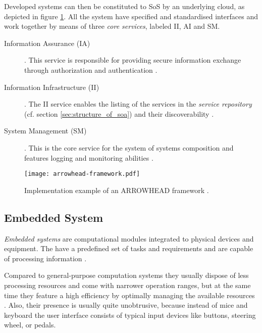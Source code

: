 Developed systems can then be constituted to SoS by an underlying cloud, as depicted in figure \ref{fig:arrowhead-framework}. All the system have specified and standardised interfaces and work together by means of three \emph{core services}, labeled II, AI and SM.
\begin{description}
\item [Information Assurance (IA)] .
This service is responsible for providing secure information exchange through authorization and authentication \cite{arrowhead:presentation}.
\item [Information Infrastructure (II)] .
The II service enables the listing of the services in the \emph{service repository} (cf. section \ref{sec:structure_of_soa}) and their discoverability \cite{arrowhead:presentation}.
\item [System Management (SM)] .
This is the core service for the system of systems composition and features logging and monitoring abilities \cite{arrowhead:presentation}.
\end{description}

\begin{figure}[ht]
\centering
\texttt{[image: arrowhead-framework.pdf]}
\caption{Implementation example of an ARROWHEAD framework \cite{arrowhead:presentation}.}
\label{fig:arrowhead-framework}
\end{figure}

\subsection{Embedded System}
\label{sec:embedded_system}

\emph{Embedded systems} are computational modules integrated to physical devices and equipment. The have a predefined set of tasks and requirements and are capable of processing information \cite{rodrigues2011} \cite[p.xiii]{marwedel}. 

Compared to general-purpose computation systems they usually dispose of less processing resources and come with narrower operation ranges, but at the same time they feature a high efficiency by optimally managing the available resources \cite[p.283]{alippi} \cite[p.5]{marwedel}. Also, their presence is usually quite unobtrusive, because instead of mice and keyboard the user interface consists of typical input devices like buttons, steering wheel, or pedals.


